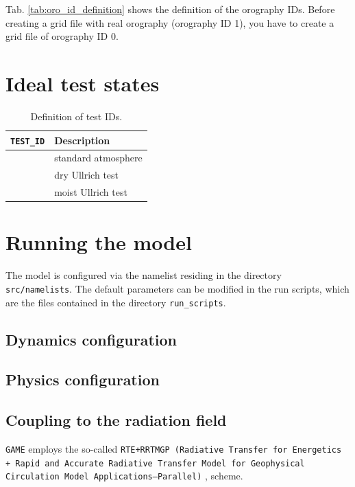 \documentclass[10pt]{report}
\begin{document}
Tab. \ref{tab:oro_id_definition} shows the definition of the orography IDs. Before creating a grid file with real orography (orography ID 1), you have to create a grid file of orography ID 0.

\chapter{Ideal test states}
\label{chap:ideal_test_states}

\renewcommand{\arraystretch}{1.2}
\begin{table}
\centering
\begin{tabular}{|>{\centering}p{4.0 cm}|>{\centering}p{8 cm}|}
\hline \textbf{\texttt{TEST\_ID}} & \textbf{Description} \tabularnewline
\hline\hline 0 & standard atmosphere \tabularnewline
\hline 1 & dry Ullrich test \tabularnewline
\hline 2 & moist Ullrich test \tabularnewline
\hline
\end{tabular}
\caption{Definition of test IDs.}
\label{tab:test_id_definition}
\end{table}
\renewcommand{\arraystretch}{1}

\chapter{Running the model}
\label{chap:running_the_model}

The model is configured via the namelist residing in the directory \texttt{src/namelists}. The default parameters can be modified in the run scripts, which are the files contained in the directory \texttt{run\_scripts}.

\section{Dynamics configuration}
\label{sec:dynamics_configuration}

\section{Physics configuration}
\label{sec:physics_configuration}

\section{Coupling to the radiation field}
\label{sec:coupling_to_the_radiation_field}

\texttt{GAME} employs the so-called \texttt{RTE+RRTMGP (Radiative Transfer for Energetics + Rapid and Accurate Radiative Transfer Model for Geophysical Circulation Model Applications—Parallel)} \cite{doi:10.1029/2019MS001621}, \cite{rte-rrtmgp-github} scheme.
\end{document}
